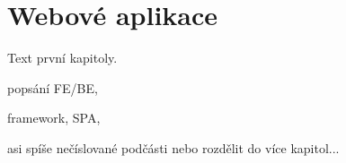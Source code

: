 \section{Webové aplikace}

Text první kapitoly.

\begin{citemize}
	\item popsání FE/BE,
	\item framework, SPA,
	\item asi spíše nečíslované podčásti nebo rozdělit do více kapitol...
\end{citemize}
